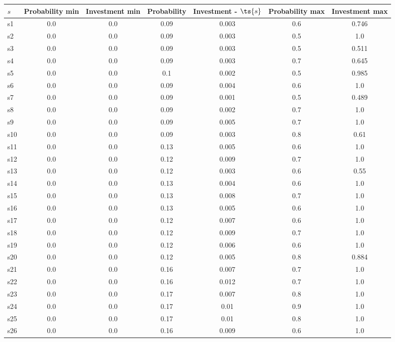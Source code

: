 \documentclass{article}
\begin{document}
\noindent\begin{tabular}{|l|c|c|c|c|c|c|}
\hline
$s$& Probability min & Investment min & Probability & Investment - $\ts{s}$ & Probability max & Investment max\\
\hline
s1 &0.0 & 0.0 & 0.09 & 0.003 & 0.6 & 0.746\\
\hline
s2 &0.0 & 0.0 & 0.09 & 0.003 & 0.5 & 1.0\\
\hline
s3 &0.0 & 0.0 & 0.09 & 0.003 & 0.5 & 0.511\\
\hline
s4 &0.0 & 0.0 & 0.09 & 0.003 & 0.7 & 0.645\\
\hline
s5 &0.0 & 0.0 & 0.1 & 0.002 & 0.5 & 0.985\\
\hline
s6 &0.0 & 0.0 & 0.09 & 0.004 & 0.6 & 1.0\\
\hline
s7 &0.0 & 0.0 & 0.09 & 0.001 & 0.5 & 0.489\\
\hline
s8 &0.0 & 0.0 & 0.09 & 0.002 & 0.7 & 1.0\\
\hline
s9 &0.0 & 0.0 & 0.09 & 0.005 & 0.7 & 1.0\\
\hline
s10 &0.0 & 0.0 & 0.09 & 0.003 & 0.8 & 0.61\\
\hline
s11 &0.0 & 0.0 & 0.13 & 0.005 & 0.6 & 1.0\\
\hline
s12 &0.0 & 0.0 & 0.12 & 0.009 & 0.7 & 1.0\\
\hline
s13 &0.0 & 0.0 & 0.12 & 0.003 & 0.6 & 0.55\\
\hline
s14 &0.0 & 0.0 & 0.13 & 0.004 & 0.6 & 1.0\\
\hline
s15 &0.0 & 0.0 & 0.13 & 0.008 & 0.7 & 1.0\\
\hline
s16 &0.0 & 0.0 & 0.13 & 0.005 & 0.6 & 1.0\\
\hline
s17 &0.0 & 0.0 & 0.12 & 0.007 & 0.6 & 1.0\\
\hline
s18 &0.0 & 0.0 & 0.12 & 0.009 & 0.7 & 1.0\\
\hline
s19 &0.0 & 0.0 & 0.12 & 0.006 & 0.6 & 1.0\\
\hline
s20 &0.0 & 0.0 & 0.12 & 0.005 & 0.8 & 0.884\\
\hline
s21 &0.0 & 0.0 & 0.16 & 0.007 & 0.7 & 1.0\\
\hline
s22 &0.0 & 0.0 & 0.16 & 0.012 & 0.7 & 1.0\\
\hline
s23 &0.0 & 0.0 & 0.17 & 0.007 & 0.8 & 1.0\\
\hline
s24 &0.0 & 0.0 & 0.17 & 0.01 & 0.9 & 1.0\\
\hline
s25 &0.0 & 0.0 & 0.17 & 0.01 & 0.8 & 1.0\\
\hline
s26 &0.0 & 0.0 & 0.16 & 0.009 & 0.6 & 1.0\\

\end{tabular}
\end{document}
